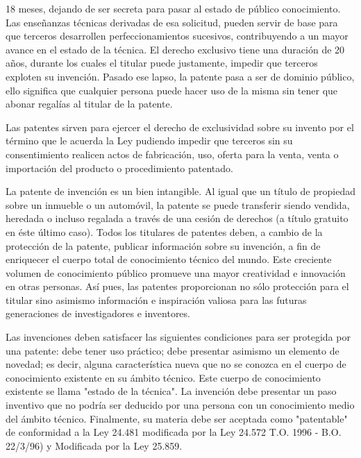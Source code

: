
18 meses, dejando de ser secreta para pasar al estado de público conocimiento. Las enseñanzas técnicas derivadas de esa solicitud, pueden servir de base para que terceros desarrollen perfeccionamientos sucesivos, contribuyendo a un mayor avance en el estado de la técnica. El derecho exclusivo tiene una duración de 20 años, durante los cuales el titular puede justamente, impedir que terceros exploten su invención. Pasado ese lapso, la patente pasa a ser de dominio público, ello significa que cualquier persona puede hacer uso de la misma sin tener que abonar regalías al titular de la patente.

Las patentes sirven para ejercer el derecho de exclusividad sobre su invento por el término que le acuerda la Ley pudiendo impedir que terceros sin su consentimiento realicen actos de fabricación, uso, oferta para la venta, venta o importación del producto o procedimiento patentado.

La patente de invención es un bien intangible. Al igual que un título de propiedad sobre un inmueble o un automóvil, la patente se puede transferir siendo vendida, heredada o incluso regalada a través de una cesión de derechos (a título gratuito en éste último caso). Todos los titulares de patentes deben, a cambio de la protección de la patente, publicar información sobre su invención, a fin de enriquecer el cuerpo total de conocimiento técnico del mundo. Este creciente volumen de conocimiento público promueve una mayor creatividad e innovación en otras personas. Así pues, las patentes proporcionan no sólo protección para el titular sino asimismo información e inspiración valiosa para las futuras generaciones de investigadores e inventores.

Las invenciones deben satisfacer las siguientes condiciones para ser protegida por una patente: debe tener uso práctico; debe presentar asimismo un elemento de novedad; es decir, alguna característica nueva que no se conozca en el cuerpo de conocimiento existente en su ámbito técnico. Este cuerpo de conocimiento existente se llama "estado de la técnica". La invención debe presentar un paso inventivo que no podría ser deducido por una persona con un conocimiento medio del ámbito técnico. Finalmente, su materia debe ser aceptada como "patentable" de conformidad a la Ley 24.481 modificada por la Ley 24.572 T.O. 1996 - B.O. 22/3/96) y Modificada por la Ley 25.859.

